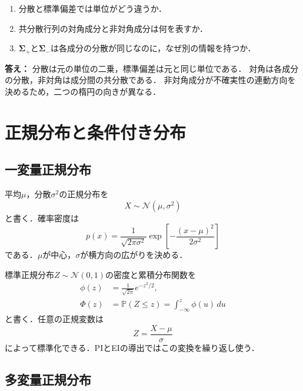 \documentclass[a4paper,11pt]{ltjsarticle}
\newcommand{\Pp}{\mathbb P}
\newcommand{\N}{\mathcal N}
\begin{document}
\begin{checkpointbox}
\begin{enumerate}
  \item 分散と標準偏差では単位がどう違うか．
  \item 共分散行列の対角成分と非対角成分は何を表すか．
  \item \(\bm\Sigma_+\)と\(\bm\Sigma_-\)は各成分の分散が同じなのに，なぜ別の情報を持つか．
\end{enumerate}
\textbf{答え：} 分散は元の単位の二乗，標準偏差は元と同じ単位である．
対角は各成分の分散，非対角は成分間の共分散である．
非対角成分が不確実性の連動方向を決めるため，二つの楕円の向きが異なる．
\end{checkpointbox}

\section{正規分布と条件付き分布}
\label{sec:gaussian-conditioning}

\subsection{一変量正規分布}

平均\(\mu\)，分散\(\sigma^2\)の正規分布を
\begin{equation}
  X\sim\N(\mu,\sigma^2)
\end{equation}
と書く．確率密度は
\begin{equation}
  p(x)
  =\frac{1}{\sqrt{2\pi\sigma^2}}
  \exp\left[-\frac{(x-\mu)^2}{2\sigma^2}\right]
  \label{eq:univariate-normal-density}
\end{equation}
である．\(\mu\)が中心，\(\sigma\)が横方向の広がりを決める．

標準正規分布\(Z\sim\N(0,1)\)の密度と累積分布関数を
\begin{align}
  \phi(z)&=\frac{1}{\sqrt{2\pi}}e^{-z^2/2},\\
  \Phi(z)&=\Pp(Z\leq z)=\int_{-\infty}^{z}\phi(u)\,du
  \label{eq:phi-Phi}
\end{align}
と書く．任意の正規変数は
\begin{equation}
  Z=\frac{X-\mu}{\sigma}
\end{equation}
によって標準化できる．PIとEIの導出ではこの変換を繰り返し使う．

\subsection{多変量正規分布}
\end{document}
